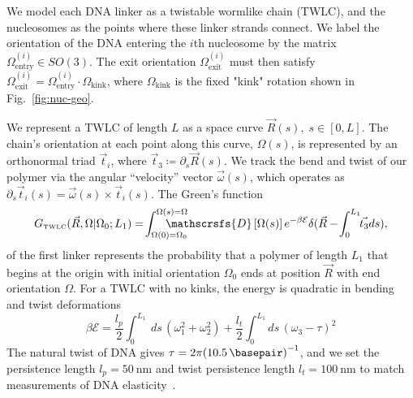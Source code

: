 \documentclass[%
 reprint,
superscriptaddress,
showpacs,preprintnumbers,
 amsmath,amssymb,
 aps,
 prl,
floatfix,
]{revtex4-1}
\newcommand{\gwlc}[2][\Omega_0; L_1]{G_\text{\tiny TWLC}(#2|#1)}
\newcommand{\pathd}[1]{\mathscrsfs{D}\left[#1\right]}
\newcommand{\energy}{\mathcal{E}}
\begin{document}

We model each DNA linker as a twistable wormlike chain (TWLC), and the nucleosomes as the
    points where these linker strands connect.
We label the orientation of the DNA entering the $i$th nucleosome by the matrix
    $\Omega^{(i)}_\text{entry}\in SO(3)$.
The exit orientation $\Omega^{(i)}_\text{exit}$ must then satisfy $\Omega^{(i)}_\text{exit}
    = \Omega^{(i)}_\text{entry} \cdot \Omega_\text{kink}$, where
    $\Omega_\text{kink}$ is the fixed "kink" rotation shown in
    Fig.~\ref{fig:nuc-geo}.

We represent a TWLC of length $L$ as a space curve $\vec{R}(s),\;s\in[0,L]$.
The chain's orientation at each point along this curve, $\Omega(s)$, is represented
    by an orthonormal triad $\vec{t}_{i}$, where $\vec{t}_{3} \coloneqq
    \partial_s \vec{R}(s)$.
We track the bend and twist of our polymer via the angular ``velocity'' vector
    $\vec{\omega}(s)$, which operates as $\partial_s \vec{t}_{i}(s) =
    \vec{\omega}(s) \times \vec{t}_{i}(s)$.
The Green's function
    \begin{equation}\label{eq:path}
        \gwlc[\Omega_0;L_1]{\vec{R}, \Omega} =\! \int_{\Omega(0)=\Omega_0}^{\Omega(s)=\Omega}
        \hspace{-0.3in}
        \pathd{\Omega(s)}
                e^{-\beta \mathcal{E}}\delta(\vec{R} - \!\int_{0}^{L_1} \!\!\vec{t_3} ds),
    \end{equation}
of the first linker represents the probability that a
    polymer of length $L_1$ that begins at the origin with initial
    orientation $\Omega_0$ ends at position $\vec{R}$ with end
    orientation $\Omega$.
For a TWLC with no kinks, the energy is quadratic in bending and twist deformations
    \begin{equation}\label{eq:energy}
        \beta\energy = \frac{l_p}{2}\int_{0}^{L_1} \!\ \! ds \,
        (\omega_1^2 + \omega_2 ^2) + \frac{l_t}{2}\int_{0}^{L_1} \! \! ds \,
        {\left(\omega_3 - \tau\right)}^2
    \end{equation}
The natural twist of DNA gives $\tau = 2 \pi {(\SI{10.5}{\basepair})}^{-1}$,
    and we set the persistence length $l_p = \SI{50}{\nano\metre}$ and twist
    persistence length {$l_t = \SI{100}{\nano\metre}$} to match
    measurements of DNA elasticity~\cite{hagerman1988,bustamante1994,bryant2003,marko1995}.
\end{document}
